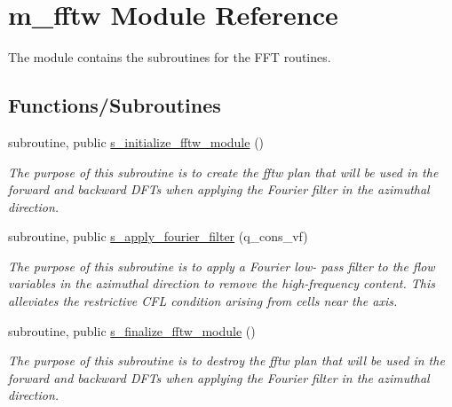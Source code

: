 \hypertarget{namespacem__fftw}{}\section{m\+\_\+fftw Module Reference}
\label{namespacem__fftw}


The module contains the subroutines for the F\+FT routines.  


\subsection*{Functions/\+Subroutines}
\begin{DoxyCompactItemize}
\item 
subroutine, public \hyperlink{namespacem__fftw_a6f924722e9573d6526d5d1ba173f4ac6}{s\+\_\+initialize\+\_\+fftw\+\_\+module} ()
\begin{DoxyCompactList}\small\item\em The purpose of this subroutine is to create the fftw plan that will be used in the forward and backward D\+F\+Ts when applying the Fourier filter in the azimuthal direction. \end{DoxyCompactList}\item 
subroutine, public \hyperlink{namespacem__fftw_ada93950a5527dfe2a35cc4f4ba77cb96}{s\+\_\+apply\+\_\+fourier\+\_\+filter} (q\+\_\+cons\+\_\+vf)
\begin{DoxyCompactList}\small\item\em The purpose of this subroutine is to apply a Fourier low-\/ pass filter to the flow variables in the azimuthal direction to remove the high-\/frequency content. This alleviates the restrictive C\+FL condition arising from cells near the axis. \end{DoxyCompactList}\item 
subroutine, public \hyperlink{namespacem__fftw_a0666fa4d38fb46540fd108b76e835b45}{s\+\_\+finalize\+\_\+fftw\+\_\+module} ()
\begin{DoxyCompactList}\small\item\em The purpose of this subroutine is to destroy the fftw plan that will be used in the forward and backward D\+F\+Ts when applying the Fourier filter in the azimuthal direction. \end{DoxyCompactList}\end{DoxyCompactItemize}
